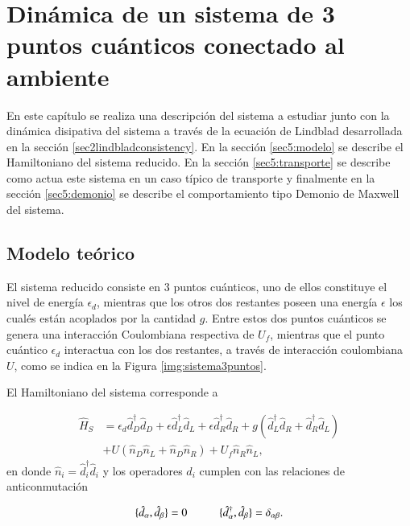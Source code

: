 \chapter{Dinámica de un sistema de 3 puntos cuánticos conectado al ambiente}
En este capítulo se realiza una descripción del sistema a estudiar junto con la dinámica disipativa del sistema a través de la ecuación de Lindblad desarrollada en la sección \ref{sec2lindbladconsistency}. En la sección \ref{sec5:modelo} se describe el Hamiltoniano del sistema reducido.  En la sección \ref{sec5:transporte} se describe como actua este sistema en un caso típico de transporte y finalmente en la sección \ref{sec5:demonio} se describe el comportamiento tipo Demonio de Maxwell del sistema.

\section{Modelo teórico}
El sistema reducido consiste en 3 puntos cuánticos, uno de ellos constituye el nivel de energía $\epsilon_{d}$, mientras que los otros dos restantes poseen una energía $\epsilon$ los cualés están acoplados por la cantidad $g$. Entre estos dos puntos cuánticos se genera una interacción Coulombiana respectiva de $U_{f}$, mientras que el punto cuántico $\epsilon_{d}$ interactua con los dos restantes, a través de interacción coulombiana $U$, como se indica en la Figura \ref{img:sistema3puntos}.



El Hamiltoniano del sistema corresponde a 

\begin{align*}
    \hat{H}_{S} & = \epsilon_{d}\hat{d}^{\dagger}_{D}\hat{d}_{D} + \epsilon \hat{d}^{\dagger}_{L}\hat{d}_{L} + \epsilon \hat{d}^{\dagger}_{R}\hat{d}_{R} + g(\hat{d}^{\dagger}_{L}\hat{d}_{R} + \hat{d}^{\dagger}_{R}\hat{d}_{L} ) \\
          & + U(\hat{n}_{D}\hat{n}_{L} + \hat{n}_{D}\hat{n}_{R} )  + U_{f}\hat{n}_{R}\hat{n}_{L},
\end{align*}
en donde $\hat{n}_{i} = \hat{d}^{\dagger}_{i} \hat{d}_{i}$ y los operadores $\hat{d}_{i}$ cumplen con las relaciones de anticonmutación

\begin{equation*}
    \{\hat{d}_{\alpha},\hat{d}_{\beta} \} = 0  \hspace{10mm} \{\hat{d}^{\dagger}_{\alpha}, \hat{d}_{\beta} \} = \delta_{\alpha \beta}.
\end{equation*}

